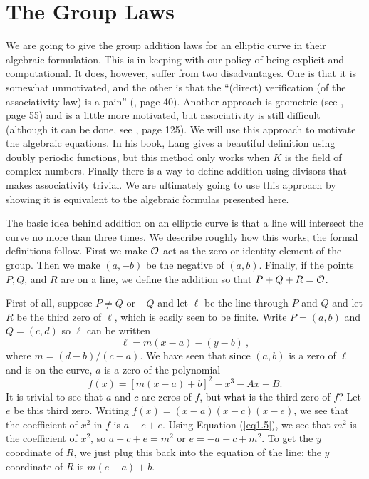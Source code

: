 \section{The Group Laws}

We are going to give the group addition laws for an elliptic curve in their algebraic formulation. This is in keeping with our policy of being explicit and computational. It does, however, suffer from two disadvantages. One is that it is somewhat unmotivated, and the other is that the ``(direct) verification (of the associativity law) is a pain'' (\cite{r1.3}, page 40). Another approach is geometric (see \cite{r1.6}, page 55) and is a little more motivated, but associativity is still difficult (although it can be done, see \cite{r1.1}, page 125). We will use this approach to motivate the algebraic equations. In his book, Lang gives a beautiful definition using doubly periodic functions, but this method only works when $K$ is the field of complex numbers. Finally there is a way to define addition using divisors that makes associativity trivial. We are ultimately going to use this approach by showing it is equivalent to the algebraic formulas presented here.

\rem
The basic idea behind addition on an elliptic curve is that a line will intersect the curve no more than three times. We describe roughly how this works; the formal definitions follow. First we make $\mathcal{O}$ act as the zero or identity element of the group. Then we make $(a,-b)$ be the negative of $(a,b)$. Finally, if the points $P,Q$, and $R$ are on a line, we define the addition so that $P+Q+R=\mathcal{O}$.

First of all, suppose $P\neq Q$ or $-Q$ and let $\ell$ be the line through $P$ and $Q$ and let $R$ be the third zero of $\ell$, which is easily seen to be finite. Write $P=(a,b)$ and $Q=(c,d)$ so $\ell$ can be written
\[\ell = m(x-a) - (y-b)\ ,\]
where $m=(d-b)/(c-a)$. We have seen that since $(a,b)$ is a zero of $\ell$ and is on the curve, $a$ is a zero of the polynomial
\begin{equation}
\label{eq1.5}
f(x)=[m(x-a)+b]^{2}-x^{3}-Ax-B .
\end{equation}
It is trivial to see that $a$ and $c$ are zeros of $f$, but what is the third zero of $f$? Let $e$ be this third zero. Writing $f(x)=(x-a)(x-c)(x-e)$, we see that the coefficient of $x^{2}$ in $f$ is $a+c+e$. Using Equation (\ref{eq1.5}), we see that $m^{2}$ is the coefficient of $x^{2}$, so $a+c+e=m^{2}$ or $e=-a-c+m^{2}$. To get the $y$ coordinate of $R$, we just plug this back into the equation of the line; the $y$ coordinate of $R$ is $m(e-a)+b$.

